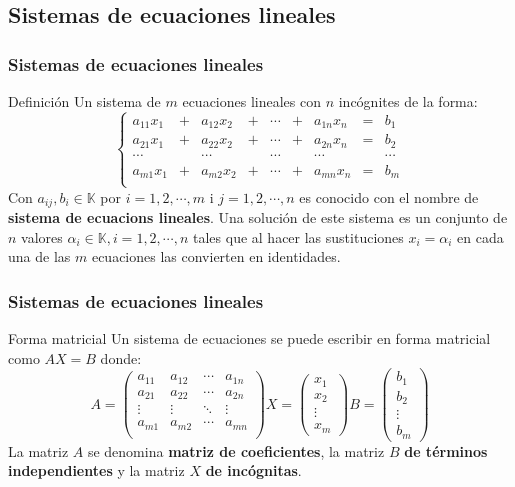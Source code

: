 \documentclass[12pt]{article}
\begin{document}
  \subsection{Sistemas de ecuaciones lineales}
         \begin{frame}
    \frametitle{Sistemas de ecuaciones lineales}
       \begin{block}{Definici\'on}
Un sistema de $m$ ecuaciones lineales con $n$ inc\'ognites de la forma:
\[\left\{\begin{array}{ccccccccc}
a_{11}x_1 & + & a_{12}x_2 & + & \cdots & + & a_{1n}x_n & = & b_1\\
a_{21}x_1 & + & a_{22}x_2 & + & \cdots & + & a_{2n}x_n & = & b_2\\
\cdots &  & \cdots &  & \cdots &  & \cdots &  & \cdots\\
a_{m1}x_1 & + & a_{m2}x_2 & + & \cdots & + & a_{mn}x_n & = & b_m\\
\end{array}\right.\]
Con $a_{ij}, b_i\in \mathbb{K}$ por $i=1,2,\cdots,m$ i $j=1,2,\cdots,n$ es conocido con el nombre de \textbf{sistema de ecuacions lineales}. Una soluci\'on de este sistema es un conjunto de $n$ valores $\alpha_i\in \mathbb{K}, i=1,2,\cdots,n$ tales que al hacer las sustituciones $x_i=\alpha_i$ en cada una de las $m$ ecuaciones las convierten en identidades.
\end{block}
  \end{frame} 
  
  
  
           \begin{frame}
    \frametitle{Sistemas de ecuaciones lineales}
       \begin{block}{Forma matricial}
Un sistema de ecuaciones se puede escribir en forma matricial como $AX=B$ donde: 
\[A=\left(\begin{array}{cccc}
a_{11} & a_{12}  & \cdots  & a_{1n} \\
a_{21} & a_{22}  & \cdots  & a_{2n} \\
\vdots &  \vdots & \ddots  & \vdots \\
a_{m1} & a_{m2} & \cdots &  a_{mn}\\
\end{array}\right)
X=\left(\begin{array}{c}
x_1 \\x_2\\\vdots \\x_m
\end{array}\right)
B=\left(\begin{array}{c}
b_1 \\b_2\\\vdots \\b_m
\end{array}\right)
\]
La matriz $A$ se denomina \textbf{matriz de coeficientes}, la matriz $B$ \textbf{de t\'erminos independientes} y la matriz $X$ \textbf{de inc\'ognitas}.

\end{block}
  \end{frame} 
  
\end{document}
